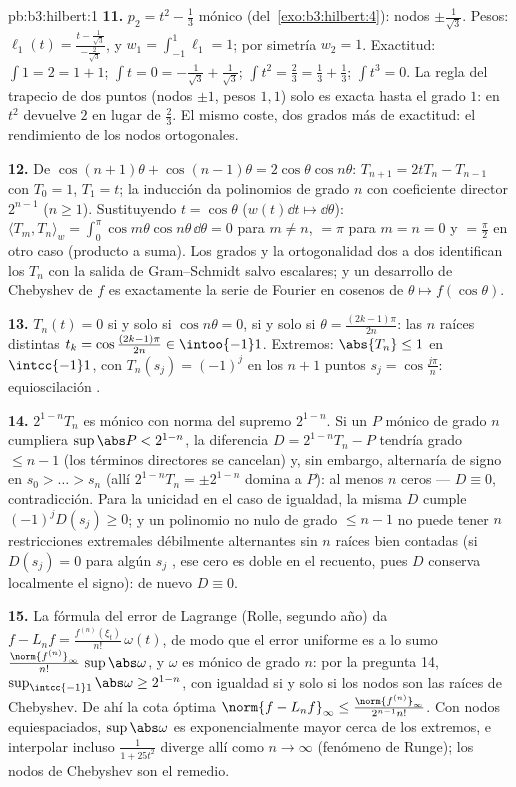 \begin{solution}{pb:b3:hilbert:1}
\textbf{11.} $p_2 = t^2 - \frac13$ mónico (del~\cref{exo:b3:hilbert:4}):
nodos $\pm\frac1{\sqrt3}$. Pesos:
$\ell_1(t) = \frac{t - \frac1{\sqrt3}}{-\frac2{\sqrt3}}$, y
$w_1 = \int_{-1}^1\ell_1 = 1$; por simetría $w_2 = 1$. Exactitud:
$\int 1 = 2 = 1 + 1$; $\int t = 0 =
-\frac1{\sqrt3} + \frac1{\sqrt3}$; $\int t^2 = \frac23 =
\frac13 + \frac13$; $\int t^3 = 0$. La regla del trapecio de dos puntos
(nodos $\pm1$, pesos $1, 1$) solo es exacta hasta el grado $1$: en $t^2$
devuelve $2$ en lugar de $\frac23$. El mismo coste, dos grados más de
exactitud: el rendimiento de los nodos ortogonales.

\textbf{12.} De $\cos(n{+}1)\theta + \cos(n{-}1)\theta =
2\cos\theta\cos n\theta$: $T_{n+1} = 2tT_n - T_{n-1}$ con $T_0 = 1$,
$T_1 = t$; la inducción da polinomios de grado $n$ con coeficiente
director $2^{n-1}$ ($n \geq 1$). Sustituyendo $t = \cos\theta$
($w(t)\dd t \mapsto
\dd\theta$): $\langle T_m, T_n\rangle_w =
\int_0^\pi\cos m\theta\cos n\theta\,\dd\theta = 0$ para $m
\neq n$, $= \pi$ para $m = n = 0$ y $= \frac\pi2$ en otro caso (producto
a suma). Los grados y la ortogonalidad dos a dos identifican los $T_n$
con la salida de Gram--Schmidt salvo escalares; y un desarrollo de
Chebyshev de $f$ es exactamente la serie de Fourier en cosenos de
$\theta \mapsto f(\cos\theta)$.

\textbf{13.} $T_n(t) = 0$ si y solo si $\cos n\theta = 0$, si y solo si
$\theta = \frac{(2k-1)\pi}{2n}$: las $n$ raíces distintas
$t_k = \cos\frac{(2k-1)\pi}{2n} \in \intoo{-1}1$. Extremos:
$\abs{T_n} \leq 1$ en $\intcc{-1}1$, con $T_n(s_j) =
(-1)^j$ en los $n + 1$ puntos $s_j = \cos\frac{j\pi}n$: equioscilación
.

\textbf{14.} $2^{1-n}T_n$ es mónico con norma del supremo $2^{1-n}$. Si
un $P$ mónico de grado $n$ cumpliera $\sup\abs P < 2^{1-n}$, la
diferencia $D = 2^{1-n}T_n - P$ tendría grado $\leq n -
1$ (los términos directores se cancelan) y, sin embargo, alternaría de
signo en $s_0 >
\dots > s_n$ (allí $2^{1-n}T_n = \pm2^{1-n}$ domina a $P$): al menos $n$
ceros --- $D \equiv 0$, contradicción. Para la unicidad en el caso de
igualdad, la misma $D$ cumple $(-1)^jD(s_j) \geq 0$; y un polinomio no
nulo de grado $\leq
n-1$ no puede tener $n$ restricciones extremales débilmente alternantes
sin $n$ raíces bien contadas (si $D(s_j) = 0$ para algún $s_j$
, ese cero es doble en el
recuento, pues $D$ conserva localmente el signo): de nuevo $D
\equiv 0$.

\textbf{15.} La fórmula del error de Lagrange (Rolle, segundo año) da
$f - L_nf = \frac{f^{(n)}(\xi_t)}{n!}\,\omega(t)$, de modo que el error
uniforme es a lo sumo $\frac{\norm{f^{(n)}}_\infty}
{n!}\,\sup\abs\omega$, y $\omega$ es mónico de grado $n$: por la
pregunta 14, $\sup_{\intcc{-1}1}\abs\omega \geq 2^{1-n}$, con igualdad
si y solo si los nodos son las raíces de Chebyshev. De ahí la cota
óptima $\norm{f - L_nf}_\infty \leq
\frac{\norm{f^{(n)}}_\infty}{2^{n-1}n!}$. Con nodos equiespaciados,
$\sup\abs\omega$ es exponencialmente mayor cerca de los extremos, e
interpolar incluso $\frac1{1 + 25t^2}$ diverge allí como $n \to \infty$
(fenómeno de Runge); los nodos de Chebyshev son el remedio.


\end{solution}
